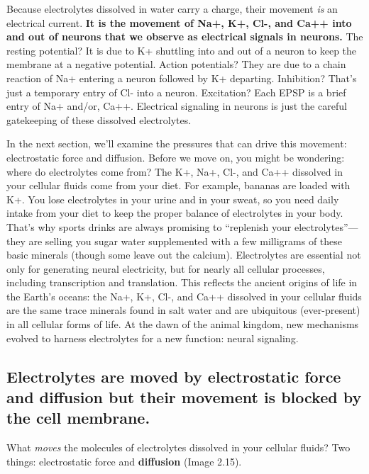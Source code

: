 \documentclass[
]{book}
\begin{document}
Because electrolytes dissolved in water carry a charge, their movement \emph{is} an electrical current. \textbf{It is the movement of Na+, K+, Cl-, and Ca++ into and out of neurons that we observe as electrical signals in neurons.} The resting potential? It is due to K+ shuttling into and out of a neuron to keep the membrane at a negative potential. Action potentials? They are due to a chain reaction of Na+ entering a neuron followed by K+ departing. Inhibition? That's just a temporary entry of Cl- into a neuron. Excitation? Each EPSP is a brief entry of Na+ and/or, Ca++. Electrical signaling in neurons is just the careful gatekeeping of these dissolved electrolytes.

In the next section, we'll examine the pressures that can drive this movement: electrostatic force and diffusion. Before we move on, you might be wondering: where do electrolytes come from? The K+, Na+, Cl-, and Ca++ dissolved in your cellular fluids come from your diet. For example, bananas are loaded with K+. You lose electrolytes in your urine and in your sweat, so you need daily intake from your diet to keep the proper balance of electrolytes in your body. That's why sports drinks are always promising to ``replenish your electrolytes''---they are selling you sugar water supplemented with a few milligrams of these basic minerals (though some leave out the calcium). Electrolytes are essential not only for generating neural electricity, but for nearly all cellular processes, including transcription and translation. This reflects the ancient origins of life in the Earth's oceans: the Na+, K+, Cl-, and Ca++ dissolved in your cellular fluids are the same trace minerals found in salt water and are ubiquitous (ever-present) in all cellular forms of life. At the dawn of the animal kingdom, new mechanisms evolved to harness electrolytes for a new function: neural signaling.

\hypertarget{electrolytes-are-moved-by-electrostatic-force-and-diffusion-but-their-movement-is-blocked-by-the-cell-membrane.}{%
\subsection{Electrolytes are moved by electrostatic force and diffusion but their movement is blocked by the cell membrane.}\label{electrolytes-are-moved-by-electrostatic-force-and-diffusion-but-their-movement-is-blocked-by-the-cell-membrane.}}

What \emph{moves} the molecules of electrolytes dissolved in your cellular fluids? Two things: electrostatic force and \textbf{diffusion }(Image 2.15).
\end{document}

